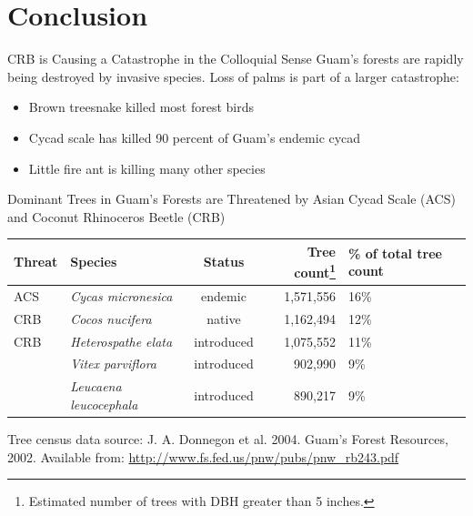 \documentclass[]{beamer}
\begin{document}
{
	
}

{
	
}

{
	
}

\section{Conclusion}

\begin{frame}{CRB is Causing a Catastrophe in the Colloquial Sense}
Guam's forests are rapidly being destroyed by invasive species. Loss of palms is part of a larger catastrophe:
\begin{itemize}
	\item Brown treesnake killed most forest birds
	\item Cycad scale has killed 90 percent of Guam's endemic cycad
	\item Little fire ant is killing many other species
\end{itemize}
\end{frame}

\begin{frame}{Dominant Trees in Guam's Forests are Threatened by Asian Cycad Scale (ACS) and Coconut Rhinoceros Beetle (CRB)}
	\begin{center}
		\begin{tabular}{llcrp{0.35in}}
			\hline
			\textbf{Threat} & \textbf{Species} & \textbf{Status} & \textbf{Tree count\footnote{Estimated number of trees with DBH greater than 5 inches.}} & \textbf{\% of total tree count}\\
			\hline
			\rowcolor{yellow}
			ACS & \textit{Cycas micronesica} & endemic & 1,571,556 & 16\% \\ 
			\rowcolor{yellow}
			CRB & \textit{Cocos nucifera} & native & 1,162,494 & 12\% \\ 
			\rowcolor{yellow}
			CRB & \textit{Heterospathe elata} & introduced & 1,075,552 & 11\% \\ 		
			\hline
			& \textit{Vitex parviflora} & introduced & 902,990 & 9\% \\ 
			& \textit{Leucaena leucocephala} & introduced & 890,217 & 9\%\\
			\hline
		\end{tabular} 
	\end{center}
	Tree census data source: J. A. Donnegon et al. 2004. Guam’s Forest Resources, 2002. Available from: \url{http://www.fs.fed.us/pnw/pubs/pnw_rb243.pdf}
\end{frame}
\end{document}
